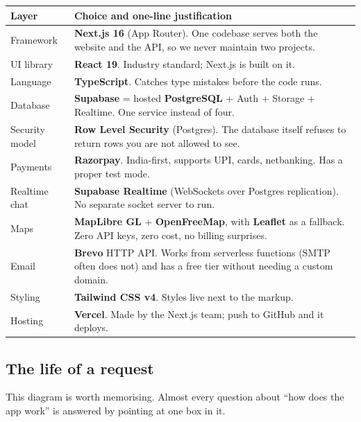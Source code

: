 \documentclass[11pt,a4paper]{article}
\begin{document}
\begin{longtable}{@{}p{3.5cm}p{11.3cm}@{}}
\toprule
\textbf{Layer} & \textbf{Choice and one-line justification} \\
\midrule
\endhead
Framework & \textbf{Next.js 16} (App Router). One codebase serves both the
website and the API, so we never maintain two projects. \\
\addlinespace
UI library & \textbf{React 19}. Industry standard; Next.js is built on it. \\
\addlinespace
Language & \textbf{TypeScript}. Catches type mistakes before the code runs. \\
\addlinespace
Database & \textbf{Supabase} = hosted \textbf{PostgreSQL} + Auth + Storage +
Realtime. One service instead of four. \\
\addlinespace
Security model & \textbf{Row Level Security} (Postgres). The database itself
refuses to return rows you are not allowed to see. \\
\addlinespace
Payments & \textbf{Razorpay}. India-first, supports UPI, cards, netbanking.
Has a proper test mode. \\
\addlinespace
Realtime chat & \textbf{Supabase Realtime} (WebSockets over Postgres
replication). No separate socket server to run. \\
\addlinespace
Maps & \textbf{MapLibre GL} + \textbf{OpenFreeMap}, with \textbf{Leaflet}
as a fallback. Zero API keys, zero cost, no billing surprises. \\
\addlinespace
Email & \textbf{Brevo} HTTP API. Works from serverless functions (SMTP often
does not) and has a free tier without needing a custom domain. \\
\addlinespace
Styling & \textbf{Tailwind CSS v4}. Styles live next to the markup. \\
\addlinespace
Hosting & \textbf{Vercel}. Made by the Next.js team; push to GitHub and it deploys. \\
\bottomrule
\end{longtable}

\subsection{The life of a request}

This diagram is worth memorising. Almost every question about ``how does the app
work'' is answered by pointing at one box in it.
\end{document}
